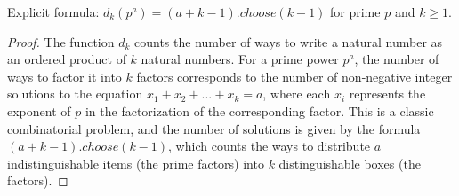 \begin{theorem}
\label{d_apply_prime_pow}
\leanok
Explicit formula: $d_k (p^a) = (a + k - 1).choose (k - 1)$ for prime $p$ and $k \geq 1$.
\end{theorem}
\begin{proof}
\leanok
The function $d_k$ counts the number of ways to write a natural number as an ordered product of $k$ natural numbers. For a prime power $p^a$, the number of ways to factor it into $k$ factors corresponds to the number of non-negative integer solutions to the equation $x_1 + x_2 + ... + x_k = a$, where each $x_i$ represents the exponent of $p$ in the factorization of the corresponding factor. This is a classic combinatorial problem, and the number of solutions is given by the formula $(a + k - 1).choose (k - 1)$, which counts the ways to distribute $a$ indistinguishable items (the prime factors) into $k$ distinguishable boxes (the factors).
\end{proof}
